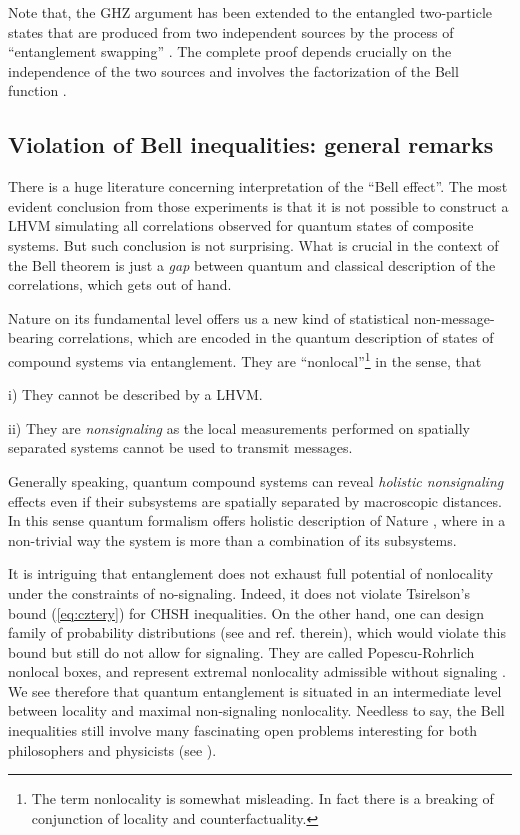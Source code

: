 \documentclass[rmp,12pt,preprint]{revtex4-2}
\begin{document}
Note that, the GHZ argument has been extended to the entangled
two-particle states that are produced from two independent sources
\cite {YurkeStoller_ent_swapping} by the process of ``entanglement
swapping'' \cite {ent_swapping}. The complete proof depends crucially
on the independence of the two sources and involves the factorization
of the Bell function \cite {GHZ1}.



\subsection {Violation of Bell inequalities: general remarks}

There is a huge literature concerning interpretation of the ``Bell
effect''. The most evident conclusion from those experiments is that
it is not possible to construct a LHVM simulating all correlations
observed for quantum states of composite systems. But such conclusion
is not surprising. What is crucial in the context of the Bell theorem
is just a {\it gap} between quantum and classical description of the
correlations, which gets out of hand.

Nature on its fundamental level offers us a new kind of statistical
non-message-bearing correlations, which are encoded in the quantum
description of states of compound systems via entanglement. They are
``nonlocal''\footnote {The term nonlocality is somewhat misleading.
  In fact there is a breaking of conjunction of locality and
  counterfactuality.} in the sense, that

i) They cannot be described by a LHVM.

ii) They are {\it nonsignaling} as the local measurements performed
on spatially separated systems cannot be used to transmit messages.

Generally speaking, quantum compound systems can reveal {\it holistic
  nonsignaling} effects even if their subsystems are spatially
separated by macroscopic distances. In this sense quantum formalism
offers holistic description of Nature \cite {Primas}, where in a
non-trivial way the system is more than a combination of its
subsystems.

It is intriguing that entanglement does not exhaust full potential of
nonlocality under the constraints of no-signaling. Indeed, it does not
violate Tsirelson's bound (\ref{eq:cztery}) for CHSH inequalities. On
the other hand, one can design family of probability distributions
(see \cite {NG} and ref. therein), which would violate this bound but
still do not allow for signaling. They are called Popescu-Rohrlich
nonlocal boxes, and represent extremal nonlocality admissible without
signaling \cite{PR}. We see therefore that quantum entanglement is
situated in an intermediate level between locality and maximal
non-signaling nonlocality. Needless to say, the Bell inequalities
still involve many fascinating open problems interesting for both
philosophers and physicists (see \cite{Gisin_philo2007}).
\end{document}
